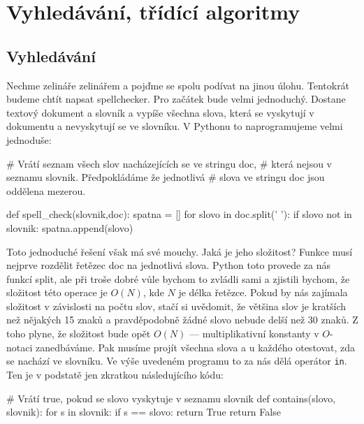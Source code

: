 \ifx\ucebnice\undefined

\setcounter{section}{2}
\fi
\section{Vyhledávání, třídící algoritmy}

\subsection*{Vyhledávání} 
Nechme zelináře zelinářem a pojďme se spolu podívat na jinou úlohu. Tentokrát budeme chtít napsat spellchecker. Pro začátek bude
velmi jednoduchý. Dostane textový dokument a slovník a vypíše všechna slova, která se vyskytují v dokumentu a nevyskytují se
ve slovníku. V Pythonu to naprogramujeme velmi jednoduše:

\begin{python}
# Vrátí seznam všech slov nacházejících se ve stringu doc,
# která nejsou v seznamu slovnik. Předpokládáme že jednotlivá
# slova ve stringu doc jsou oddělena mezerou.

def spell_check(slovnik,doc):  
  spatna = []  
  for slovo in doc.split(' '):
    if slovo not in slovnik:
      spatna.append(slovo)
\end{python}

Toto jednoduché řešení však má své mouchy. Jaká je jeho složitost? Funkce musí nejprve rozdělit řetězec doc na jednotlivá slova.
Python toto provede za nás funkcí split, ale při troše dobré vůle bychom to zvládli sami a zjistili bychom, že složitost této
operace je $O(N)$, kde $N$ je délka řetězce. Pokud by nás zajímala složitost v závislosti na počtu slov, stačí si uvědomit, že
většina slov je kratších než nějakých 15 znaků a pravděpodobně žádné slovo nebude delší než 30 znaků. Z toho plyne, že složitost
bude opět $O(N)$ --- multiplikativní konstanty v $O$-notaci zanedbáváme. Pak musíme projít všechna slova a u každého otestovat,
zda se nachází ve slovníku. Ve výše uvedeném programu to za nás dělá operátor {\tt in}. Ten je v podstatě jen zkratkou
následujícího kódu:

\begin{python}
# Vrátí true, pokud se slovo vyskytuje v seznamu slovnik
def contains(slovo, slovnik):
  for s in slovnik:
    if s == slovo:
      return True
  return False
\end{python}


